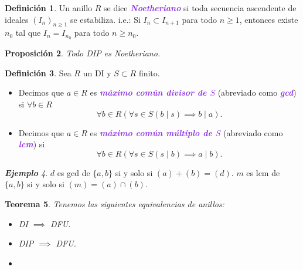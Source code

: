 \documentclass{article}
\newtheorem{theorem}{Teorema}[subsection]
\newtheorem{proposition}[theorem]{Proposición}
\theoremstyle{definition}
\newtheorem{definition}[theorem]{Definición}
\theoremstyle{remark}
\newtheorem{example}[theorem]{\textbf{Ejemplo}}
\numberwithin{equation}{section}
\newcommand{\wea}[1]{\textcolor{BlueViolet}{\textbf{\emph{#1}}}}
\newcommand{\fecha}[1]{\begin{flushright} \underline{#1} \end{flushright}}
\begin{document}
\begin{definition}
  Un anillo $R$ se dice \wea{Noetheriano} si toda secuencia ascendente de ideales $(I_n)_{n \geq 1}$ se estabiliza. i.e.: Si $I_n \subset I_{n+1}$ para todo $n \geq 1$, entonces existe $n_0$ tal que $I_n = I_{n_0}$ para todo $n \geq n_0$.
\end{definition}

\begin{proposition}
  Todo DIP es Noetheriano.
\end{proposition}

\begin{definition}
  Sea $R$ un DI y $S \subset R$ finito.
  \begin{itemize}
    \item Decimos que $a \in R$ es \wea{máximo común divisor de $S$} (abreviado como \wea{gcd}) si $\forall b \in R$ 
    \[ \forall b \in R (\forall s \in S (b \mid s) \implies b \mid a). \]
    \item Decimos que $a \in R$ es \wea{máximo común múltiplo de $S$} (abreviado como \wea{lcm}) si 
    \[ \forall b \in R (\forall s \in S(s \mid b) \implies a \mid b). \]
  \end{itemize}
\end{definition}

\begin{example}
  $d$ es gcd de $\{a,b\}$ si y solo si $(a) + (b) = (d)$. $m$ es lcm de $\{a,b\}$ si y solo si $(m) = (a) \cap (b)$.
\end{example} %



\newpage
\begin{theorem}
  Tenemos las siguientes equivalencias de anillos:
  \begin{itemize}
    \item DI $\implies$ DFU.
    \item DIP $\implies$ DFU.
    \item 
  \end{itemize}
\end{theorem}
\end{document}
